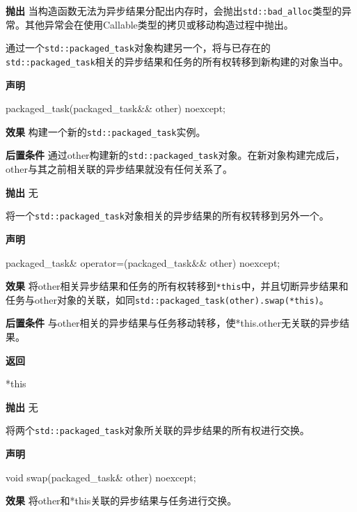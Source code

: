 \textbf{抛出}
当构造函数无法为异步结果分配出内存时，会抛出\texttt{std::bad\_alloc}类型的异常。其他异常会在使用Callable类型的拷贝或移动构造过程中抛出。


通过一个\texttt{std::packaged\_task}对象构建另一个，将与已存在的\texttt{std::packaged\_task}相关的异步结果和任务的所有权转移到新构建的对象当中。

\textbf{声明}

\begin{cpp}
packaged_task(packaged_task&& other) noexcept;
\end{cpp}

\textbf{效果}
构建一个新的\texttt{std::packaged\_task}实例。

\textbf{后置条件}
通过other构建新的\texttt{std::packaged\_task}对象。在新对象构建完成后，other与其之前相关联的异步结果就没有任何关系了。

\textbf{抛出}
无


将一个\texttt{std::packaged\_task}对象相关的异步结果的所有权转移到另外一个。

\textbf{声明}

\begin{cpp}
packaged_task& operator=(packaged_task&& other) noexcept;
\end{cpp}

\textbf{效果}
将other相关异步结果和任务的所有权转移到\texttt{*this}中，并且切断异步结果和任务与other对象的关联，如同\texttt{std::packaged\_task(other).swap(*this)}。

\textbf{后置条件}
与other相关的异步结果与任务移动转移，使*this.other无关联的异步结果。

\textbf{返回}

\begin{cpp}
*this
\end{cpp}

\textbf{抛出}
无


将两个\texttt{std::packaged\_task}对象所关联的异步结果的所有权进行交换。

\textbf{声明}

\begin{cpp}
void swap(packaged_task& other) noexcept;
\end{cpp}

\textbf{效果}
将other和*this关联的异步结果与任务进行交换。

